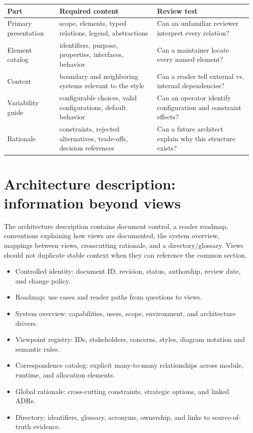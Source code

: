 \documentclass[10pt,letterpaper]{article}
\begin{document}
\small
\begin{tabularx}{\linewidth}{@{}YYY@{}}
\toprule
\textbf{Part} & \textbf{Required content} & \textbf{Review test} \\
\midrule
Primary presentation & scope, elements, typed relations, legend, abstractions & Can an unfamiliar reviewer interpret every relation? \\
Element catalog & identifiers, purpose, properties, interfaces, behavior & Can a maintainer locate every named element? \\
Context & boundary and neighboring systems relevant to the style & Can a reader tell external vs. internal dependencies? \\
Variability guide & configurable choices, valid configurations, default behavior & Can an operator identify configuration and constraint effects? \\
Rationale & constraints, rejected alternatives, trade-offs, decision references & Can a future architect explain why this structure exists? \\
\bottomrule
\end{tabularx}
\normalsize
\section{Architecture description: information beyond views}
The architecture description contains document control, a reader roadmap, conventions explaining how views are documented, the system overview, mappings between views, crosscutting rationale, and a directory/glossary. Views should not duplicate stable context when they can reference the common section.

\begin{itemize}
\item Controlled identity: document ID, revision, status, authorship, review date, and change policy.
\item Roadmap: use cases and reader paths from questions to views.
\item System overview: capabilities, users, scope, environment, and architecture drivers.
\item Viewpoint registry: IDs, stakeholders, concerns, styles, diagram notation and semantic rules.
\item Correspondence catalog: explicit many-to-many relationships across module, runtime, and allocation elements.
\item Global rationale: cross-cutting constraints, strategic options, and linked ADRs.
\item Directory: identifiers, glossary, acronyms, ownership, and links to source-of-truth evidence.
\end{itemize}
\end{document}
